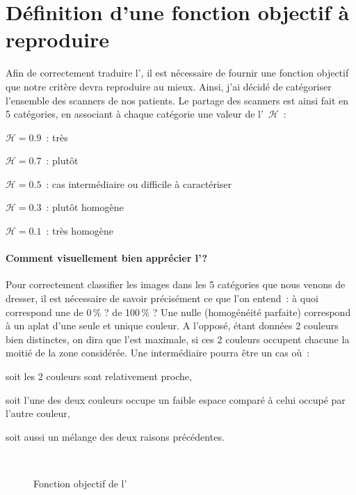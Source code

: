 \documentclass[main.tex]{subfiles}
\begin{document}

\section{Définition d'une fonction objectif à reproduire}
Afin de correctement traduire l'\hetero, il est nécessaire de fournir une fonction objectif que notre critère devra reproduire au mieux. Ainsi, j'ai décidé de catégoriser l'ensemble des scanners de nos patients. Le partage des scanners est ainsi fait en 5 catégories, en associant à chaque catégorie une valeur de l'\hetero~$\mathscr{H}$~:
\begin{myitemize}
\item $\mathscr{H}=0.9$~: très \heterogene
\item $\mathscr{H}=0.7$~: plutôt \heterogene
\item $\mathscr{H}=0.5$~: cas intermédiaire ou difficile à caractériser
\item $\mathscr{H}=0.3$~: plutôt homogène
\item $\mathscr{H}=0.1$~: très homogène
\end{myitemize}

\paragraph{Comment visuellement bien apprécier l'\hetero ?}
Pour correctement classifier les images dans les 5 catégories que nous venons de dresser, il est nécessaire de savoir précisément ce que l'on entend~: à quoi correspond une \hetero de 0\,\% ? de 100\,\% ? Une \hetero nulle (\ie homogénéité parfaite) correspond à un aplat d'une seule et unique couleur. A l'opposé, étant données 2 couleurs bien distinctes, on dira que l'\hetero est maximale, si  ces 2 couleurs occupent chacune la moitié de la zone considérée. Une \hetero intermédiaire pourra être un cas où~:
\begin{myitemize}
\item soit les 2 couleurs sont relativement proche,
\item soit l'une des deux couleurs occupe un faible espace comparé à celui occupé par l'autre couleur, 
\item soit aussi un mélange des deux raisons précédentes.
\end{myitemize}~
\begin{figure}
\caption{\label{fig:hetero_visuelle}Fonction objectif de l'\hetero}
\end{figure}
\end{document}
